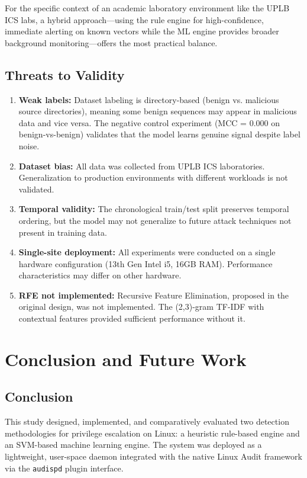 \documentclass[journal]{./IEEEtran}
\begin{document}
For the specific context of an academic laboratory environment like the UPLB ICS labs, a hybrid approach---using the rule engine for high-confidence, immediate alerting on known vectors while the ML engine provides broader background monitoring---offers the most practical balance.

\subsection{Threats to Validity}

\begin{enumerate}
    \item \textbf{Weak labels:} Dataset labeling is directory-based (benign vs. malicious source directories), meaning some benign sequences may appear in malicious data and vice versa. The negative control experiment (MCC = 0.000 on benign-vs-benign) validates that the model learns genuine signal despite label noise.
    \item \textbf{Dataset bias:} All data was collected from UPLB ICS laboratories. Generalization to production environments with different workloads is not validated.
    \item \textbf{Temporal validity:} The chronological train/test split preserves temporal ordering, but the model may not generalize to future attack techniques not present in training data.
    \item \textbf{Single-site deployment:} All experiments were conducted on a single hardware configuration (13th Gen Intel i5, 16GB RAM). Performance characteristics may differ on other hardware.
    \item \textbf{RFE not implemented:} Recursive Feature Elimination, proposed in the original design, was not implemented. The (2,3)-gram TF-IDF with contextual features provided sufficient performance without it.
\end{enumerate}

\section{Conclusion and Future Work}

\subsection{Conclusion}

This study designed, implemented, and comparatively evaluated two detection methodologies for privilege escalation on Linux: a heuristic rule-based engine and an SVM-based machine learning engine. The system was deployed as a lightweight, user-space daemon integrated with the native Linux Audit framework via the \texttt{audispd} plugin interface.
\end{document}
